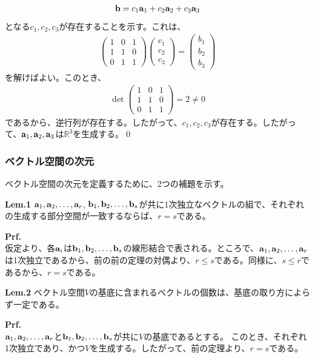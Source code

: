 \documentclass[a4paper,11pt]{jsarticle}
\numberwithin{equation}{section}
\begin{document}
\begin{align}
  \vb{b} = c_1\vb{a}_1 + c_2\vb{a}_2 + c_3\vb{a}_3
\end{align}
となる$c_1, c_2, c_3$が存在することを示す。これは、
\begin{align}
  \begin{pmatrix}
    1 & 0 & 1\\
    1 & 1 & 0\\
    0 & 1 & 1
  \end{pmatrix}
  \begin{pmatrix}
    c_1\\
    c_2\\
    c_3
  \end{pmatrix}
  =
  \begin{pmatrix}
    b_1\\
    b_2\\
    b_3
  \end{pmatrix}
\end{align}
を解けばよい。このとき、
\begin{align}
  \det
  \begin{pmatrix}
    1 & 0 & 1\\
    1 & 1 & 0\\
    0 & 1 & 1
  \end{pmatrix}
  = 2 \neq 0
\end{align}
であるから、逆行列が存在する。したがって、$c_1, c_2, c_3$が存在する。したがって、$\vb{a}_1, \vb{a}_2, \vb{a}_3$は$\mathbb{R}^3$を生成する。\qed \\

\subsubsection{ベクトル空間の次元}
ベクトル空間の次元を定義するために、2つの補題を示す。
\begin{itembox}[l]{\textbf{Lem.1}}
  $\vb{a}_1, \vb{a}_2, \dots, \vb{a}_r$, $\vb{b}_1, \vb{b}_2, \dots, \vb{b}_s$が共に1次独立なベクトルの組で、それぞれの生成する部分空間が一致するならば、$r=s$である。
\end{itembox}
\textbf{Prf.}\\
仮定より、各$\vb{a}_i$は$\vb{b}_1, \vb{b}_2, \dots, \vb{b}_s$の線形結合で表される。ところで、$\vb{a}_1, \vb{a}_2, \dots, \vb{a}_r$は1次独立であるから、前の前の定理の対偶より、$r \leq s$である。同様に、$s \leq r$であるから、$r=s$である。\hfill\qedsymbol\\

\begin{itembox}[l]{\textbf{Lem.2}}
  ベクトル空間$V$の基底に含まれるベクトルの個数は、基底の取り方によらず一定である。
\end{itembox}
\textbf{Prf.}\\
$\vb{a}_1, \vb{a}_2, \dots, \vb{a}_r$と$\vb{b}_1, \vb{b}_2, \dots, \vb{b}_s$が共に$V$の基底であるとする。
このとき、それぞれ1次独立であり、かつ$V$を生成する。したがって、前の定理より、$r=s$である。\hfill\qedsymbol\\
\end{document}
